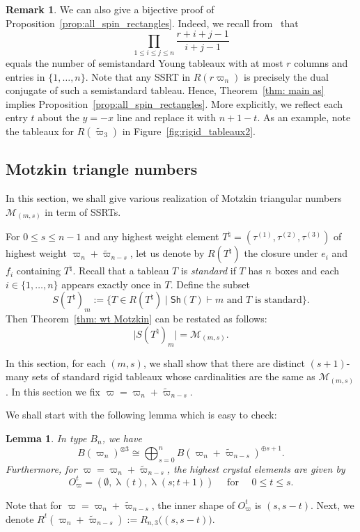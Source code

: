 \documentclass[11pt, leqno]{amsart}
\theoremstyle{plain}
\newtheorem{lemma}[theorem]{Lemma}
\theoremstyle{definition}
\newtheorem{remark}[theorem]{Remark}
\numberwithin{equation}{section}
\newcommand{\iso}{\cong} %
\newcommand{\fw}{\varpi} %
\newcommand{\tfw}{\widetilde{\fw}} %
\newcommand{\seteq}{\mathbin{:=}}
\newcommand{\Mot}{\mathcal{M}} %
\newcommand{\Sh}{\mathsf{Sh}}
\newcommand{\defn}[1]{{\color{darkred}\emph{#1}}} %
\begin{document}
\begin{remark}
\label{rem:bijective_spin_rectangles}
We can also give a bijective proof of Proposition~\ref{prop:all_spin_rectangles}. Indeed, we recall from~\cite{Gordon83} that
\[
\prod_{1 \leq i \leq j \leq n} \dfrac{r+i+j-1}{i+j-1}
\]
equals the number of semistandard Young tableaux with at most $r$ columns and entries in $\{1, \dotsc, n\}$.
Note that any SSRT in $R(r\fw_n)$ is precisely the dual conjugate of such a semistandard tableau. Hence, Theorem~\ref{thm: main as} implies Proposition~\ref{prop:all_spin_rectangles}. More explicitly, we reflect each entry $t$ about the $y=-x$ line and replace it with $n+1-t$. As an example, note the tableaux for $R(\tfw_3)$ in Figure~\ref{fig:rigid_tableaux2}.
\end{remark}


\subsection{Motzkin triangle numbers}

In this section, we shall give various realization of Motzkin triangular numbers $\Mot_{(m,s)}$ in term of SSRTs.

For $0\le s \le n-1$ and any highest weight element $T^{\natural} =(\tau^{(1)},\tau^{(2)},\tau^{(3)})$ of highest weight $\fw_n+\tfw_{n-s}$, let us denote by $R(T^{\natural})$ the closure under $e_i$ and $f_i$ containing $T^{\natural}$.
Recall that a tableau $T$ is \defn{standard} if $T$ has $n$ boxes and each $i \in \{1, \dotsc, n\}$ appears exactly once in $T$.
Define the subset
\[
S(T^{\natural})_m \seteq \{  T \in R(T^{\natural}) \mid \text{$\Sh(T) \vdash m$ and $T$ is standard} \}.
\]
Then Theorem~\ref{thm: wt Motzkin} can be restated as follows:
\[
\lvert S(T^{\natural})_m \rvert = \Mot_{(m,s)}.
\]


In this section, for each $(m,s)$, we shall show that there are distinct $(s+1)$-many sets of standard rigid tableaux
whose cardinalities are the same as $\Mot_{(m,s)}$. In this section we fix $\fw=\fw_n+\tfw_{n-s}$.

We shall start with the following lemma which is easy to check:

\begin{lemma}
\label{lemma: tens3_Bn}
In type $B_n$, we have
\[
B(\fw_n)^{\otimes 3} \iso \bigoplus_{s=0}^{n} B(\fw_n+\tfw_{n-s})^{\oplus s+1}.
\]
Furthermore, for $\fw = \fw_n+\tfw_{n-s}$, the highest crystal elements are given by
\[
O^t_{\fw} = (\emptyset, \uplambda(t), \uplambda(s;t+1)) \quad \text{ for } \quad 0 \le t \le s.
\]
\end{lemma}
Note that for $\fw = \fw_n+\tfw_{n-s}$, the inner shape of $O^t_{\fw}$ is $(s,s-t)$. Next, we denote $R^t(\fw_n+\tfw_{n-s}) \seteq R_{n,3}\bigl((s,s-t)\bigr)$.
\end{document}
